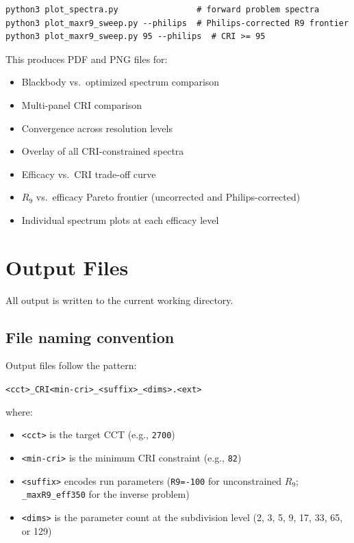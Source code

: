 \documentclass[11pt]{article}
\newcommand{\cmd}[1]{\texttt{#1}}
\begin{document}
\begin{lstlisting}[style=shell]
python3 plot_spectra.py                # forward problem spectra
python3 plot_maxr9_sweep.py --philips  # Philips-corrected R9 frontier
python3 plot_maxr9_sweep.py 95 --philips  # CRI >= 95
\end{lstlisting}

This produces PDF and PNG files for:
\begin{itemize}
  \item Blackbody vs.\ optimized spectrum comparison
  \item Multi-panel CRI comparison
  \item Convergence across resolution levels
  \item Overlay of all CRI-constrained spectra
  \item Efficacy vs.\ CRI trade-off curve
  \item $R_9$ vs.\ efficacy Pareto frontier (uncorrected and Philips-corrected)
  \item Individual spectrum plots at each efficacy level
\end{itemize}

\section{Output Files}
\label{sec:output}

All output is written to the current working directory.

\subsection{File naming convention}

Output files follow the pattern:
\begin{center}
\cmd{<cct>\_CRI<min-cri>\_<suffix>\_<dims>.<ext>}
\end{center}
where:
\begin{itemize}
  \item \cmd{<cct>} is the target CCT (e.g., \cmd{2700})
  \item \cmd{<min-cri>} is the minimum CRI constraint (e.g., \cmd{82})
  \item \cmd{<suffix>} encodes run parameters (\cmd{R9=-100} for
    unconstrained $R_9$; \cmd{\_maxR9\_eff350} for the inverse problem)
  \item \cmd{<dims>} is the parameter count at the subdivision level
    (2, 3, 5, 9, 17, 33, 65, or 129)
\end{itemize}
\end{document}
